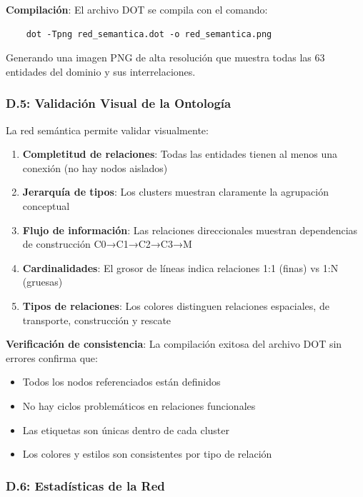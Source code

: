 \documentclass[conference]{IEEEtran}
\begin{document}
    \textbf{Compilación}: El archivo DOT se compila con el comando:
    \begin{verbatim}
    dot -Tpng red_semantica.dot -o red_semantica.png
    \end{verbatim}

    Generando una imagen PNG de alta resolución que muestra todas las 63 entidades del dominio y sus interrelaciones.

    \subsubsection*{D.5: Validación Visual de la Ontología}

    La red semántica permite validar visualmente:

    \begin{enumerate}[leftmargin=*,itemsep=1pt]
    \item \textbf{Completitud de relaciones}: Todas las entidades tienen al menos una conexión (no hay nodos aislados)
    \item \textbf{Jerarquía de tipos}: Los clusters muestran claramente la agrupación conceptual
    \item \textbf{Flujo de información}: Las relaciones direccionales muestran dependencias de construcción C0→C1→C2→C3→M
    \item \textbf{Cardinalidades}: El grosor de líneas indica relaciones 1:1 (finas) vs 1:N (gruesas)
    \item \textbf{Tipos de relaciones}: Los colores distinguen relaciones espaciales, de transporte, construcción y rescate
    \end{enumerate}

    \textbf{Verificación de consistencia}: La compilación exitosa del archivo DOT sin errores confirma que:
    \begin{itemize}[leftmargin=*,itemsep=1pt]
    \item Todos los nodos referenciados están definidos
    \item No hay ciclos problemáticos en relaciones funcionales
    \item Las etiquetas son únicas dentro de cada cluster
    \item Los colores y estilos son consistentes por tipo de relación
    \end{itemize}

    \subsubsection*{D.6: Estadísticas de la Red}
\end{document}
